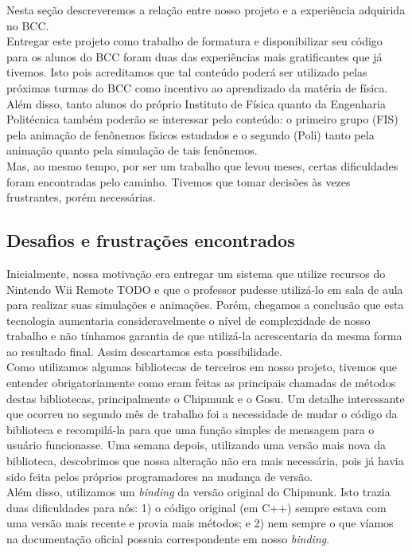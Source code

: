 Nesta seção descreveremos a relação entre nosso projeto e a experiência adquirida no BCC.\\ 

Entregar este projeto como trabalho de formatura e disponibilizar seu código para os alunos do BCC foram duas das experiências mais gratificantes que já tivemos. Isto pois acreditamos que tal conteúdo poderá ser utilizado pelas próximas turmas do BCC como incentivo ao aprendizado da matéria de física. Além disso, tanto alunos do próprio Instituto de Física quanto da Engenharia Politécnica também poderão se interessar pelo conteúdo: o primeiro grupo (FIS) pela animação de fenônemos físicos estudados e o segundo (Poli) tanto pela animação quanto pela simulação de tais fenônemos. \\

Mas, ao mesmo tempo, por ser um trabalho que levou meses, certas dificuldades foram encontradas pelo caminho. Tivemos que tomar decisões às vezes frustrantes, porém necessárias.\\

\subsection{Desafios e frustrações encontrados}
Inicialmente, nossa motivação era entregar um sistema que utilize recursos do Nintendo Wii Remote TODO e que o professor pudesse utilizá-lo em sala de aula para realizar suas simulações e animações. Porém, chegamos a conclusão que esta tecnologia aumentaria consideravelmente o nível de complexidade de nosso trabalho e não tínhamos garantia de que utilizá-la acrescentaria da mesma forma ao resultado final. Assim descartamos esta possibilidade.\\

Como utilizamos algumas bibliotecas de terceiros em nosso projeto, tivemos que entender obrigatoriamente como eram feitas as principais chamadas de métodos destas bibliotecas, principalmente o Chipmunk e o Gosu. Um detalhe interessante que ocorreu no segundo mês de trabalho foi a necessidade de mudar o código da biblioteca e recompilá-la para que uma função simples de mensagem para o usuário funcionasse. Uma semana depois, utilizando uma versão mais nova da biblioteca, descobrimos que nossa alteração não era mais necessária, pois já havia sido feita pelos próprios programadores na mudança de versão.\\

Além disso, utilizamos um \textit{binding} da versão original do Chipmunk. Isto trazia duas dificuldades para nós: 1) o código original (em C++) sempre estava com uma versão mais recente e provia mais métodos; e 2) nem sempre o que víamos na documentação oficial possuia correspondente em nosso \textit{binding}. \\
 
